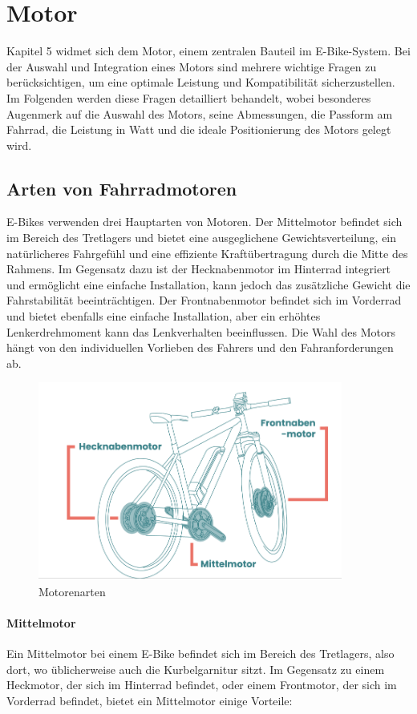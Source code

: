 \chapter{Motor}


Kapitel 5 widmet sich dem Motor, einem zentralen Bauteil im E-Bike-System.
Bei der Auswahl und Integration eines Motors sind mehrere wichtige Fragen zu berücksichtigen, um eine optimale Leistung und Kompatibilität sicherzustellen.
Im Folgenden werden diese Fragen detailliert behandelt, wobei besonderes Augenmerk auf die Auswahl des Motors, seine Abmessungen, die Passform am Fahrrad, die Leistung in Watt und die ideale Positionierung des Motors gelegt wird.
\section{Arten von Fahrradmotoren}
E-Bikes verwenden drei Hauptarten von Motoren.
Der Mittelmotor befindet sich im Bereich des Tretlagers und bietet eine ausgeglichene Gewichtsverteilung, ein natürlicheres Fahrgefühl und eine effiziente Kraftübertragung durch die Mitte des Rahmens.
Im Gegensatz dazu ist der Hecknabenmotor im Hinterrad integriert und ermöglicht eine einfache Installation, kann jedoch das zusätzliche Gewicht die Fahrstabilität beeinträchtigen.
Der Frontnabenmotor befindet sich im Vorderrad und bietet ebenfalls eine einfache Installation, aber ein erhöhtes Lenkerdrehmoment kann das Lenkverhalten beeinflussen.
Die Wahl des Motors hängt von den individuellen Vorlieben des Fahrers und den Fahranforderungen ab.
\begin{figure}[h]
    \centering
    \includegraphics[width=10cm]{images/Motor_Arten}
    \caption{Motorenarten\cite{noauthor_e-bike_nodate}}%
    \label{fig:7}
\end{figure}

\subsubsection*{Mittelmotor}
Ein Mittelmotor bei einem E-Bike befindet sich im Bereich des Tretlagers, also dort, wo üblicherweise auch die Kurbelgarnitur sitzt.
Im Gegensatz zu einem Heckmotor, der sich im Hinterrad befindet, oder einem Frontmotor, der sich im Vorderrad befindet, bietet ein Mittelmotor einige Vorteile:\\

